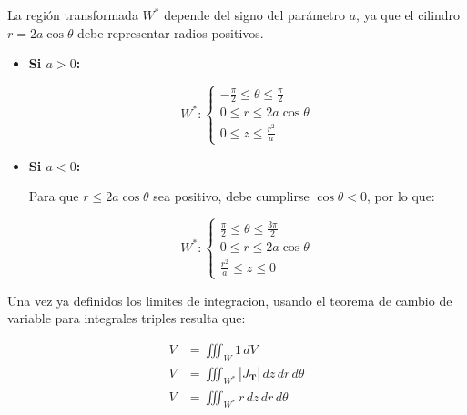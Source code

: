 La región transformada $W^*$ depende del signo del parámetro $a$, ya que el cilindro $r = 2a\cos\theta$ debe representar radios positivos.

\begin{itemize}

\item \textbf{Si $a>0$:}

\begin{equation*}
W^*:
\begin{cases}
-\frac{\pi}{2} \le \theta \le \frac{\pi}{2} \\
0 \le r \le 2a \cos \theta \\
0 \le z \le \frac{r^2}{a}
\end{cases}
\end{equation*}

\item \textbf{Si $a<0$:}

Para que $r \le 2a\cos\theta$ sea positivo, debe cumplirse $\cos\theta <0$, por lo que:

\begin{equation*}
W^*:
\begin{cases}
\frac{\pi}{2} \le \theta \le \frac{3\pi}{2} \\
0 \le r \le 2a \cos \theta \\
\frac{r^2}{a} \le z \le 0
\end{cases}
\end{equation*}

\end{itemize}

Una vez ya definidos los limites de integracion, usando el teorema de cambio de variable para integrales triples resulta que:

\begin{align}
V &= \iiint_{W} 1 \, dV \\
V &= \iiint_{W^*} |J_{\mathbf{T}}| \, dz \, dr \, d\theta \\
V &= \iiint_{W^*} r\, dz \, dr \, d\theta
\end{align}

